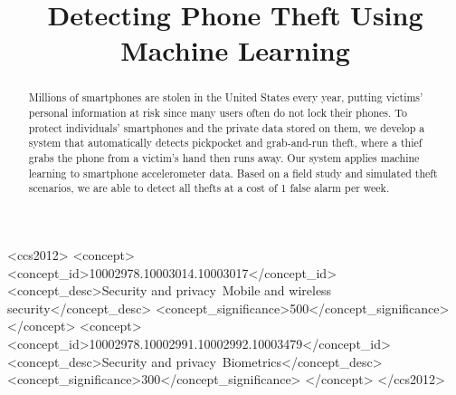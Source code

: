 \documentclass[sigconf, anonymous]{acmart}
\begin{document}
\title{Detecting Phone Theft Using Machine Learning} %

\begin{abstract}
Millions of smartphones are stolen in the United States every year, putting victims' personal information at risk since many users often do not lock their phones. 
To protect individuals' smartphones and the private data stored on them, we develop a system that automatically detects pickpocket and grab-and-run theft, where a thief grabs the phone from a victim's hand then runs away. 
Our system applies machine learning to smartphone accelerometer data. Based on a field study and simulated theft scenarios, we are able to detect all thefts at a cost of 1 false alarm per week.
\end{abstract}

\begin{CCSXML}
<ccs2012>
<concept>
<concept_id>10002978.10003014.10003017</concept_id>
<concept_desc>Security and privacy~Mobile and wireless security</concept_desc>
<concept_significance>500</concept_significance>
</concept>
<concept>
<concept_id>10002978.10002991.10002992.10003479</concept_id>
<concept_desc>Security and privacy~Biometrics</concept_desc>
<concept_significance>300</concept_significance>
</concept>
</ccs2012>
\end{CCSXML}



\maketitle




\end{document}
